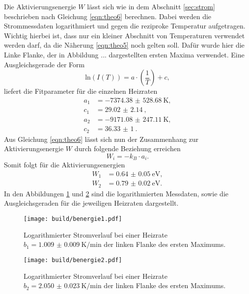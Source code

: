 Die Aktivierungsenergie $W$ lässt sich wie in dem Abschnitt \ref{sec:strom} beschrieben nach Gleichung \eqref{eqn:theo6} berechnen. Dabei werden die Strommessdaten logarithmiert und gegen 
die reziproke Temperatur aufgetragen. Wichtig hierbei ist, dass nur ein kleiner Abschnitt von Temperaturen verwendet werden darf, da
die Näherung \eqref{eqn:theo5} noch gelten soll. Dafür wurde hier die Linke Flanke, der in Abbildung ... dargestellten ersten Maxima verwendet. Eine Ausgleichsgerade der Form
\begin{equation}
\text{ln}(I(T)) = a \cdot \left( \frac{1}{T}\right) + c,
\end{equation}
liefert die Fitparameter für die einzelnen Heizraten
\begin{align*}
a_1 &= \SI{-7374.38(52868)}{\kelvin},\\
c_1&= \SI{29.02(214)}{},\\
a_2 &= \SI{-9171.08(24711)}{\kelvin},\\
c_2&= \SI{36.33(100)}{}.
\end{align*}
Aus Gleichung \eqref{eqn:theo6} lässt sich nun der Zusammenhang zur Aktivierungsenergie $W$ durch folgende Beziehung erreichen
\begin{equation}
W_i = - k_B \cdot a_i.
\end{equation}
Somit folgt für die Aktivierungsenergien 
\begin{align}
W_1 &= \SI{0.64(5)}{\electronvolt},\\
W_2 &= \SI{0.79(2)}{\electronvolt}.
\end{align}
In den Abbildungen \ref{fig:a4} und \ref{fig:a5} sind die logarithmierten Messdaten, sowie die Ausgleichsgeraden für die jeweiligen Heizraten dargestellt.
\begin{figure}
    \centering
    \texttt{[image: build/benergie1.pdf]}
    \caption{Logarithmierter Stromverlauf bei einer Heizrate \newline $b_1 = \SI{1.009(9)}{\kelvin\per\minute}$ der linken Flanke des ersten Maximums.
            }
    \label{fig:a4}
\end{figure}
\begin{figure}
    \centering
    \texttt{[image: build/benergie2.pdf]}
    \caption{Logarithmierter Stromverlauf bei einer Heizrate \newline $b_2 = \SI{2.050(23)}{\kelvin\per\minute}$ der linken Flanke des ersten Maximums.
            }
    \label{fig:a5}
\end{figure}

